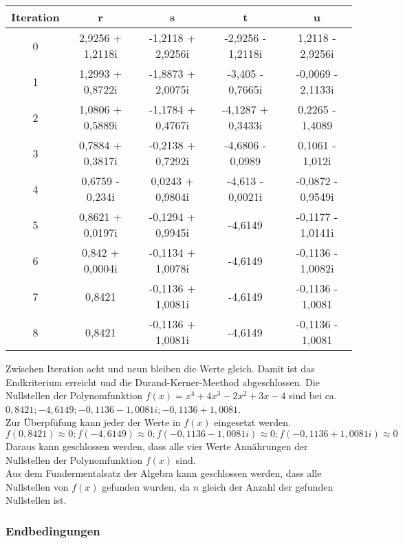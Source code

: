 \documentclass[12pt]{article}
\begin{document}
        \begin{center}
        \begin{tabular}{c|c c c c}
            Iteration & r & s & t & u \\
            \hline
            0 & 2,9256 + 1,2118i & -1,2118 + 2,9256i & -2,9256 - 1,2118i & 1,2118 - 2,9256i \\
            1 & 1,2993 + 0,8722i & -1,8873 + 2,0075i & -3,405 - 0,7665i & -0,0069 - 2,1133i \\
            2 & 1,0806 + 0,5889i & -1,1784 + 0,4767i & -4,1287 + 0,3433i & 0,2265 - 1,4089 \\
            3 & 0,7884 + 0,3817i & -0,2138 + 0,7292i & -4,6806 - 0,0989 & 0,1061 - 1,012i \\
            4 & 0,6759 - 0,234i & 0,0243 + 0,9804i & -4,613 - 0,0021i & -0,0872 - 0,9549i \\
            5 & 0,8621 + 0,0197i & -0,1294 + 0,9945i & -4,6149 & -0,1177 - 1,0141i \\
            6 & 0,842 + 0,0004i & -0,1134 + 1,0078i & -4,6149 & -0,1136 - 1,0082i \\
            7 & 0,8421 & -0,1136 + 1,0081i & -4,6149 & -0,1136 - 1,0081 \\
            8 & 0,8421 & -0,1136 + 1,0081i & -4,6149 & -0,1136 - 1,0081 \\
        \end{tabular}
        \end{center}
        Zwischen Iteration acht und neun bleiben die Werte gleich. Damit ist das Endkriterium erreicht und die Durand-Kerner-Meethod abgeschlossen. Die Nullstellen der Polynomfunktion $f(x) = x^4 + 4x^3 - 2x^2 + 3x - 4$ sind bei ca. $0,8421; -4,6149; -0,1136 - 1,0081i; -0,1136 + 1,0081$. \\
        Zur Überpfüfung kann jeder der Werte in $f(x)$ eingesetzt werden.
        \begin{displaymath}
            f(0,8421) \approx 0; f(-4,6149) \approx 0; f(-0,1136 - 1,0081i) \approx 0; f(-0,1136 + 1,0081i) \approx 0
        \end{displaymath}
        Daraus kann geschlossen werden, dass alle vier Werte Annährungen der Nullstellen der Polynomfunktion $f(x)$ sind. \\
        Aus dem Fundermentalsatz der Algebra kann geschlossen werden, dass alle Nullstellen von $f(x)$ gefunden wurden, da $n$ gleich der Anzahl der gefunden Nullstellen ist.
    \subsubsection{Endbedingungen}
\end{document}
